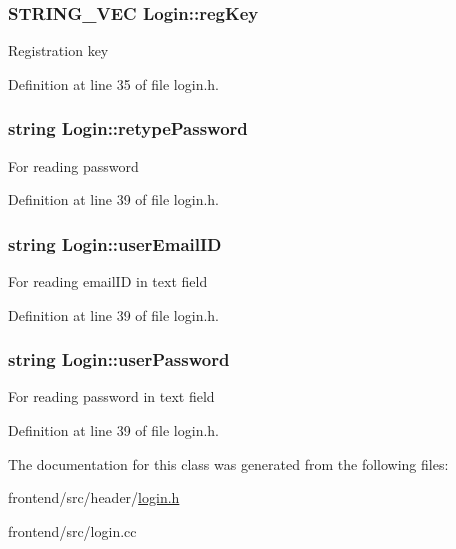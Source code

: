 \hypertarget{classLogin_ae22f0ed73e5248cd71a7b2167676376a}{
\subsubsection[{reg\-Key}]{\setlength{\rightskip}{0pt plus 5cm}S\-T\-R\-I\-N\-G\-\_\-\-V\-E\-C Login\-::reg\-Key\hspace{0.3cm}{\ttfamily [protected]}}}\label{classLogin_ae22f0ed73e5248cd71a7b2167676376a}
Registration key 

Definition at line 35 of file login.\-h.

\hypertarget{classLogin_ade36f8943aafce470ef4b8353c79b2c6}{
\subsubsection[{retype\-Password}]{\setlength{\rightskip}{0pt plus 5cm}string Login\-::retype\-Password\hspace{0.3cm}{\ttfamily [protected]}}}\label{classLogin_ade36f8943aafce470ef4b8353c79b2c6}
For reading password 

Definition at line 39 of file login.\-h.

\hypertarget{classLogin_aa83b4706e0f0f0afc65f210ee8e4839a}{
\subsubsection[{user\-Email\-I\-D}]{\setlength{\rightskip}{0pt plus 5cm}string Login\-::user\-Email\-I\-D\hspace{0.3cm}{\ttfamily [protected]}}}\label{classLogin_aa83b4706e0f0f0afc65f210ee8e4839a}
For reading email\-I\-D in text field 

Definition at line 39 of file login.\-h.

\hypertarget{classLogin_a9731be126468f535f161f045c95687c6}{
\subsubsection[{user\-Password}]{\setlength{\rightskip}{0pt plus 5cm}string Login\-::user\-Password\hspace{0.3cm}{\ttfamily [protected]}}}\label{classLogin_a9731be126468f535f161f045c95687c6}
For reading password in text field 

Definition at line 39 of file login.\-h.



The documentation for this class was generated from the following files\-:\begin{DoxyCompactItemize}
\item 
frontend/src/header/\hyperlink{login_8h}{login.\-h}\item 
frontend/src/login.\-cc\end{DoxyCompactItemize}
